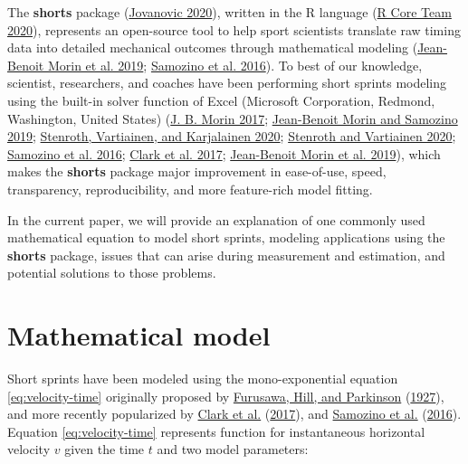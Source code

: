 \documentclass[fleqn,10pt,lineno]{wlpeerj} %
\begin{document}
The \textbf{shorts} package (\protect\hyperlink{ref-R-shorts}{Jovanovic 2020}), written in the R language (\protect\hyperlink{ref-R-base}{R Core Team 2020}), represents an open-source tool to help sport scientists translate raw timing data into detailed mechanical outcomes through mathematical modeling (\protect\hyperlink{ref-morinSimpleMethodComputing2019}{Jean-Benoit Morin et al. 2019}; \protect\hyperlink{ref-samozinoSimpleMethodMeasuring2016}{Samozino et al. 2016}). To best of our knowledge, scientist, researchers, and coaches have been performing short sprints modeling using the built-in solver function of Excel (Microsoft Corporation, Redmond, Washington, United States) (\protect\hyperlink{ref-morinSpreadsheetSprintAcceleration2017}{J. B. Morin 2017}; \protect\hyperlink{ref-morinSpreadsheetSprintAcceleration2019}{Jean-Benoit Morin and Samozino 2019}; \protect\hyperlink{ref-stenrothForcevelocityProfilingIce2020}{Stenroth, Vartiainen, and Karjalainen 2020}; \protect\hyperlink{ref-stenrothSpreadsheetSprintAcceleration2020}{Stenroth and Vartiainen 2020}; \protect\hyperlink{ref-samozinoSimpleMethodMeasuring2016}{Samozino et al. 2016}; \protect\hyperlink{ref-clarkNFLCombine40Yard2017}{Clark et al. 2017}; \protect\hyperlink{ref-morinSimpleMethodComputing2019}{Jean-Benoit Morin et al. 2019}), which makes the \textbf{shorts} package major improvement in ease-of-use, speed, transparency, reproducibility, and more feature-rich model fitting.

In the current paper, we will provide an explanation of one commonly used mathematical equation to model short sprints, modeling applications using the \textbf{shorts} package, issues that can arise during measurement and estimation, and potential solutions to those problems.

\hypertarget{mathematical-model}{%
\section{Mathematical model}\label{mathematical-model}}

Short sprints have been modeled using the mono-exponential equation \eqref{eq:velocity-time} originally proposed by \protect\hyperlink{ref-doi:10.1098ux2frspb.1927.0035}{Furusawa, Hill, and Parkinson} (\protect\hyperlink{ref-doi:10.1098ux2frspb.1927.0035}{1927}), and more recently popularized by \protect\hyperlink{ref-clarkNFLCombine40Yard2017}{Clark et al.} (\protect\hyperlink{ref-clarkNFLCombine40Yard2017}{2017}), and \protect\hyperlink{ref-samozinoSimpleMethodMeasuring2016}{Samozino et al.} (\protect\hyperlink{ref-samozinoSimpleMethodMeasuring2016}{2016}). Equation \eqref{eq:velocity-time} represents function for instantaneous horizontal velocity \(v\) given the time \(t\) and two model parameters:
\end{document}
